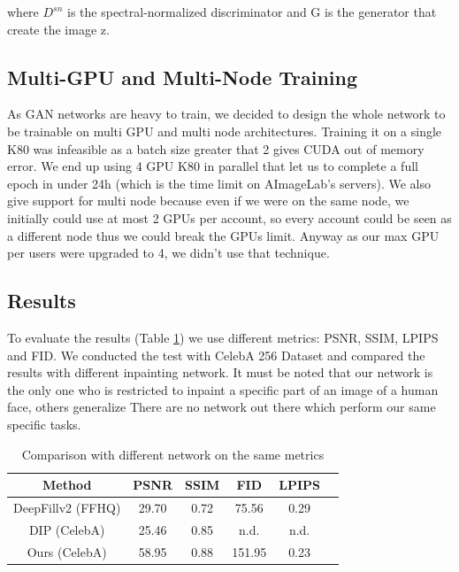 \documentclass[10pt,twocolumn,letterpaper]{article}
\begin{document}
where \(D^{sn}\) is the spectral-normalized discriminator and G is the generator
that create the image z.

\subsection{Multi-GPU and Multi-Node Training}
As GAN networks are heavy to train, we decided to design the whole network to be
trainable on multi GPU and multi node architectures. Training it on a single K80
was infeasible as a batch size greater that 2 gives CUDA out of memory error.
We end up using 4 GPU K80 in parallel that let us to complete a full epoch in
under 24h (which is the time limit on AImageLab's servers). We also give support
for multi node because even if we were on the same node, we initially could use
at most 2 GPUs per account, so every account could be seen as a different node
thus we could break the GPUs limit. Anyway as our max GPU per users were
upgraded to 4, we didn't use that technique.

\subsection{Results}
To evaluate the results (Table \ref{tab:results}) we use different metrics:
PSNR, SSIM, LPIPS and FID. We conducted the test with CelebA 256 Dataset and
compared the results with different inpainting network. It must be noted that
our network is the only one who is restricted to inpaint a specific part of an
image of a human face, others generalize
There are no network out there which perform our same specific tasks.
\begin{table}
  \begin{tabular}{|c|c|c|c|c|c|}
    \hline
    Method & PSNR & SSIM & FID & LPIPS \\
    \hline
    DeepFillv2 (FFHQ) & 29.70 & 0.72 & 75.56 & 0.29 \\
    DIP (CelebA)      & 25.46 & 0.85 & n.d. & n.d. \\
    Ours (CelebA)     & 58.95 & 0.88 & 151.95 & 0.23\\
  \hline
  \end{tabular}
  \\
  \caption{Comparison with different network on the same metrics}
  \label{tab:results}
\end{table}
\end{document}
